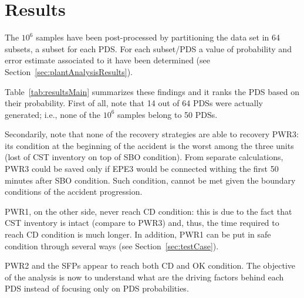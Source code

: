 \section{Results}
\label{sec:results}
The $10^6$ samples have been post-processed by partitioning the data set in 64 subsets, a subset for each
PDS. 
For each subset/PDS a value of probability and error estimate associated to it have been determined 
(see Section~\ref{sec:plantAnalysisResults}).

Table~\ref{tab:resultsMain} summarizes these findings and it ranks the PDS based on their probability.
First of all, note that 14 out of 64 PDSs were actually generated; i.e., none of the $10^6$ samples 
belong to 50 PDSs.

Secondarily, note that none of the recovery strategies are able to recovery PWR3: its condition at 
the beginning of the accident is the worst among the three units (lost of CST inventory on top of 
SBO condition). From separate calculations, PWR3 could be saved only if EPE3 would be connected
withing the first 50 minutes after SBO condition. Such condition, cannot be met given the boundary
conditions of the accident progression.

PWR1, on the other side, never reach CD condition: this is due to the fact that CST inventory is 
intact (compare to PWR3) and, thus, the time required to reach CD condition is much longer. In addition,
PWR1 can be put in safe condition through several ways (see Section~\ref{sec:testCase}).

PWR2 and the SFPs appear to reach both CD and OK condition. The objective of the analysis is now 
to understand what are the driving factors behind each PDS instead of focusing only on PDS 
probabilities. 

